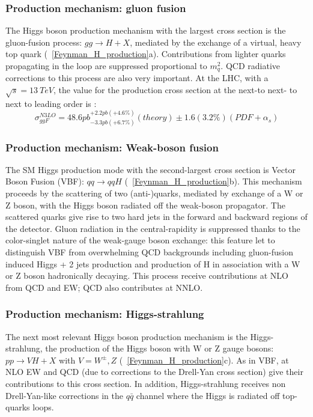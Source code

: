 \subsubsection{Production mechanism: gluon fusion}
The Higgs boson production mechanism with the largest cross section is the gluon-fusion process: $gg \to H + X$, mediated by the exchange of a virtual, heavy top quark (\figurename~\ref{Feynman_H_production}a). Contributions from lighter quarks propagating in the loop are suppressed proportional to $m_{q}^{2}$. QCD radiative corrections to this process are also very important. At the LHC, with a $\sqrt{s} = 13\ TeV$, the value for the production cross section at the next-to next- to next  to leading order is \cite{ggF_value}:
\begin{equation}
\sigma^{N3LO}_{ggF} = 48.6pb^{+2.2pb(+4.6\%)}_{-3.3pb(+6.7\%)}(theory) \pm 1.6(3.2\%)(PDF+\alpha_{s})
\label{ggH_cross_section}
\end{equation}

\subsubsection{Production mechanism: Weak-boson fusion}
The SM Higgs production mode with the second-largest cross section is Vector Boson Fusion (VBF): $qq \to qqH$ (\figurename~\ref{Feynman_H_production}b). This mechanism proceeds by the scattering of two (anti-)quarks, mediated by exchange of a W or Z boson, with the Higgs boson radiated off the weak-boson propagator. The scattered quarks give rise to two hard jets in the forward and backward regions of the detector. Gluon radiation in the central-rapidity is suppressed thanks to the color-singlet nature of the weak-gauge boson exchange: this feature let to distinguish VBF from overwhelming QCD backgrounds including gluon-fusion induced Higgs + 2 jets production and production of H in association with a W or Z boson hadronically decaying. This process receive contributions at NLO from QCD and EW; QCD also contributes at NNLO.

\subsubsection{Production mechanism: Higgs-strahlung}
The next most relevant Higgs boson production mechanism is the Higgs-strahlung, the production of the Higgs boson with W or Z gauge bosons: $pp \to VH + X$ with $V = W^{\pm},Z$ (\figurename~\ref{Feynman_H_production}c). As in VBF, at NLO EW and QCD (due to corrections to the Drell-Yan cross section) give their contributions to this cross section. In addition, Higgs-strahlung receives non Drell-Yan-like corrections in the $q\bar{q}$ channel where the Higgs is radiated off top-quarks loops.

